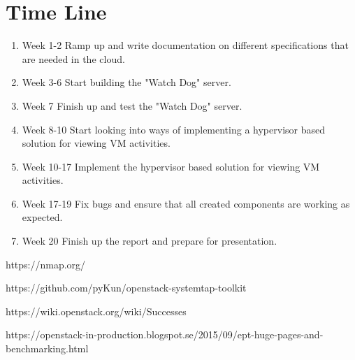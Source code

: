 \documentclass[12pt]{article}
\begin{document}
\section{Time Line}
\begin{enumerate}
    \item Week 1-2 Ramp up and write documentation on different specifications that are needed in the cloud.
    \item Week 3-6 Start building the "Watch Dog" server.
    \item Week 7 Finish up and test the "Watch Dog" server.
    \item Week 8-10 Start looking into ways of implementing a hypervisor based solution for viewing VM activities.
    \item Week 10-17 Implement the hypervisor based solution for viewing VM activities.
    \item Week 17-19 Fix bugs and ensure that all created components are working as expected.
    \item Week 20 Finish up the report and prepare for presentation.
\end{enumerate}

\begin{thebibliography}{1}

    https://nmap.org/

    https://github.com/pyKun/openstack-systemtap-toolkit

    https://wiki.openstack.org/wiki/Successes

    https://openstack-in-production.blogspot.se/2015/09/ept-huge-pages-and-benchmarking.html

\end{thebibliography}
\end{document}
